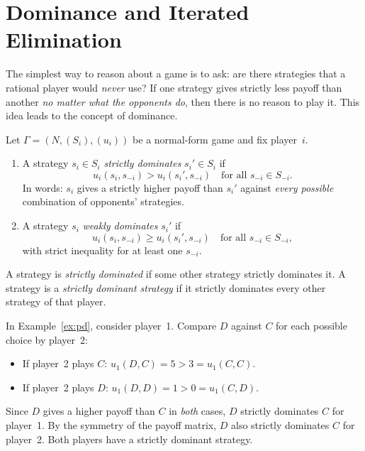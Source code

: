 \documentclass[11pt,a4paper]{article}
\begin{document}

\section{Dominance and Iterated Elimination}
\label{sec:dominance}

The simplest way to reason about a game is to ask: are there strategies
that a rational player would \emph{never} use?  If one strategy gives
strictly less payoff than another \emph{no matter what the opponents do},
then there is no reason to play it.  This idea leads to the concept of
dominance.

\begin{definition}
\label{def:dominance}
Let $\Gamma = (N, (S_i), (u_i))$ be a normal-form game and fix player~$i$.
\begin{enumerate}[nosep,label=(\alph*)]
    \item A strategy $s_i \in S_i$ \emph{strictly dominates} $s_i' \in S_i$
    if
    \[
        u_i(s_i, s_{-i}) > u_i(s_i', s_{-i})
        \quad \text{for all } s_{-i} \in S_{-i}.
    \]
    In words: $s_i$ gives a strictly higher payoff than $s_i'$ against
    \emph{every possible} combination of opponents' strategies.
    \item A strategy $s_i$ \emph{weakly dominates} $s_i'$ if
    \[
        u_i(s_i, s_{-i}) \geq u_i(s_i', s_{-i})
        \quad \text{for all } s_{-i} \in S_{-i},
    \]
    with strict inequality for at least one $s_{-i}$.
\end{enumerate}
A strategy is \emph{strictly dominated} if some other strategy strictly
dominates it.  A strategy is a \emph{strictly dominant strategy} if it
strictly dominates every other strategy of that player.
\end{definition}

\begin{example}
\label{ex:pd_dominance}
In Example~\ref{ex:pd}, consider player~1.  Compare $D$ against $C$ for
each possible choice by player~2:
\begin{itemize}[nosep]
    \item If player~2 plays $C$: $u_1(D, C) = 5 > 3 = u_1(C, C)$.
    \item If player~2 plays $D$: $u_1(D, D) = 1 > 0 = u_1(C, D)$.
\end{itemize}
Since $D$ gives a higher payoff than $C$ in \emph{both} cases, $D$
strictly dominates $C$ for player~1.  By the symmetry of the payoff matrix,
$D$ also strictly dominates $C$ for player~2.  Both players have a strictly
dominant strategy.
\end{example}
\end{document}

